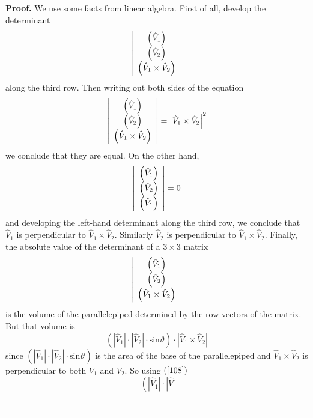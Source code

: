 \documentclass{article}%
\newenvironment{proof}[1][Proof]{\noindent\textbf{#1.} }{\ \rule{0.5em}{0.5em}}
\begin{document}
\begin{proof}
We use some facts from linear algebra. First of all, develop the determinant%
\[
\left\vert
\begin{array}
[c]{c}%
\left(  \hat{V}_{1}\right) \\
\left(  \hat{V}_{2}\right) \\
\left(  \hat{V}_{1}\times\hat{V}_{2}\right)
\end{array}
\right\vert
\]
along the third row. Then writing out both sides of the equation%
\begin{equation}
\left\vert
\begin{array}
[c]{c}%
\left(  \hat{V}_{1}\right) \\
\left(  \hat{V}_{2}\right) \\
\left(  \hat{V}_{1}\times\hat{V}_{2}\right)
\end{array}
\right\vert =\left\vert \hat{V}_{1}\times\hat{V}_{2}\right\vert ^{2}
\label{108}%
\end{equation}
we conclude that they are equal. On the other hand,
\[
\left\vert
\begin{array}
[c]{c}%
\left(  \hat{V}_{1}\right) \\
\left(  \hat{V}_{2}\right) \\
\left(  \hat{V}_{1}\right)
\end{array}
\right\vert =0
\]
and developing the left-hand determinant along the third row, we conclude that
$\hat{V}_{1}$ is perpendicular to $\hat{V}_{1}\times\hat{V}_{2}$. Similarly
$\hat{V}_{2}$ is perpendicular to $\hat{V}_{1}\times\hat{V}_{2}$. Finally, the
absolute value of the determinant of a $3\times3$ matrix%
\[
\left\vert
\begin{array}
[c]{c}%
\left(  \hat{V}_{1}\right) \\
\left(  \hat{V}_{2}\right) \\
\left(  \hat{V}_{1}\times\hat{V}_{2}\right)
\end{array}
\right\vert
\]
is the volume of the parallelepiped determined by the row vectors of the
matrix. But that volume is%
\[
\left(  \left\vert \hat{V}_{1}\right\vert \cdot\left\vert \hat{V}%
_{2}\right\vert \cdot\mathrm{sin}\vartheta\right)  \cdot\left\vert \hat{V}%
_{1}\times\hat{V}_{2}\right\vert
\]
since $\left(  \left\vert \hat{V}_{1}\right\vert \cdot\left\vert \hat{V}%
_{2}\right\vert \cdot\mathrm{sin}\vartheta\right)  $ is the area of the base
of the parallelepiped and $\hat{V}_{1}\times\hat{V}_{2}$ is perpendicular to
both $V_{1}$ and $V_{2}$. So using $\left(  \ref{108}\right)  $%
\[
\left(  \left\vert \hat{V}_{1}\right\vert \cdot\left\vert \hat{V}%
\]
\end{proof}
\end{document}
